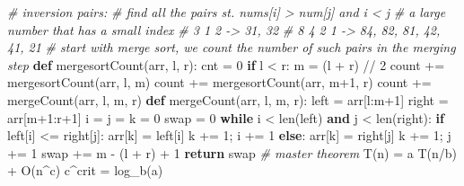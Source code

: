\documentclass[
]{article}
\newenvironment{Shaded}{}{}
\newcommand{\BuiltInTok}[1]{#1}
\newcommand{\CommentTok}[1]{\textcolor[rgb]{0.38,0.63,0.69}{\textit{#1}}}
\newcommand{\ControlFlowTok}[1]{\textcolor[rgb]{0.00,0.44,0.13}{\textbf{#1}}}
\newcommand{\DecValTok}[1]{\textcolor[rgb]{0.25,0.63,0.44}{#1}}
\newcommand{\KeywordTok}[1]{\textcolor[rgb]{0.00,0.44,0.13}{\textbf{#1}}}
\newcommand{\NormalTok}[1]{#1}
\newcommand{\OperatorTok}[1]{\textcolor[rgb]{0.40,0.40,0.40}{#1}}
\begin{document}
\begin{Shaded}
\begin{Highlighting}[]
\CommentTok{\# inversion pairs: }
\CommentTok{\# find all the pairs st. nums[i] \textgreater{} num[j] and i \textless{} j}
\CommentTok{\# a large number that has a small index}
\CommentTok{\# 3 1 2 {-}\textgreater{} 31, 32 }
\CommentTok{\# 8 4 2 1 {-}\textgreater{} 84, 82, 81, 42, 41, 21}
\CommentTok{\# start with merge sort, we count the number of such pairs in the merging step}
\KeywordTok{def}\NormalTok{ mergesortCount(arr, l, r):}
\NormalTok{	cnt }\OperatorTok{=} \DecValTok{0}
  \ControlFlowTok{if}\NormalTok{ l }\OperatorTok{\textless{}}\NormalTok{ r:}
\NormalTok{    m }\OperatorTok{=}\NormalTok{ (l }\OperatorTok{+}\NormalTok{ r) }\OperatorTok{//} \DecValTok{2}
\NormalTok{    count }\OperatorTok{+=}\NormalTok{ mergesortCount(arr, l, m)}
\NormalTok{    count }\OperatorTok{+=}\NormalTok{ mergesortCount(arr, m}\OperatorTok{+}\DecValTok{1}\NormalTok{, r)}
\NormalTok{    count }\OperatorTok{+=}\NormalTok{ mergeCount(arr, l, m, r)}
\KeywordTok{def}\NormalTok{ mergeCount(arr, l, m, r):}
\NormalTok{  left }\OperatorTok{=}\NormalTok{ arr[l:m}\OperatorTok{+}\DecValTok{1}\NormalTok{]}
\NormalTok{  right }\OperatorTok{=}\NormalTok{ arr[m}\OperatorTok{+}\DecValTok{1}\NormalTok{:r}\OperatorTok{+}\DecValTok{1}\NormalTok{]}
\NormalTok{  i }\OperatorTok{=}\NormalTok{ j }\OperatorTok{=}\NormalTok{ k }\OperatorTok{=} \DecValTok{0}
\NormalTok{ 	swap }\OperatorTok{=} \DecValTok{0}
  \ControlFlowTok{while}\NormalTok{ i }\OperatorTok{\textless{}} \BuiltInTok{len}\NormalTok{(left) }\KeywordTok{and}\NormalTok{ j }\OperatorTok{\textless{}} \BuiltInTok{len}\NormalTok{(right):}
    \ControlFlowTok{if}\NormalTok{ left[i] }\OperatorTok{\textless{}=}\NormalTok{ right[j]:}
\NormalTok{      arr[k] }\OperatorTok{=}\NormalTok{ left[i]}
\NormalTok{      k }\OperatorTok{+=} \DecValTok{1}\OperatorTok{;}\NormalTok{ i }\OperatorTok{+=} \DecValTok{1}
    \ControlFlowTok{else}\NormalTok{:}
\NormalTok{      arr[k] }\OperatorTok{=}\NormalTok{ right[j]}
\NormalTok{      k }\OperatorTok{+=} \DecValTok{1}\OperatorTok{;}\NormalTok{ j }\OperatorTok{+=} \DecValTok{1}
\NormalTok{      swap }\OperatorTok{+=}\NormalTok{ m }\OperatorTok{{-}}\NormalTok{ (l }\OperatorTok{+}\NormalTok{ r) }\OperatorTok{+} \DecValTok{1}
  \ControlFlowTok{return}\NormalTok{ swap}
\CommentTok{\# master theorem}
\NormalTok{T(n) }\OperatorTok{=}\NormalTok{ a T(n}\OperatorTok{/}\NormalTok{b) }\OperatorTok{+}\NormalTok{ O(n}\OperatorTok{\^{}}\NormalTok{c)}
\NormalTok{c}\OperatorTok{\^{}}\NormalTok{crit }\OperatorTok{=}\NormalTok{ log\_b(a)}

\end{Highlighting}
\end{Shaded}
\end{document}
